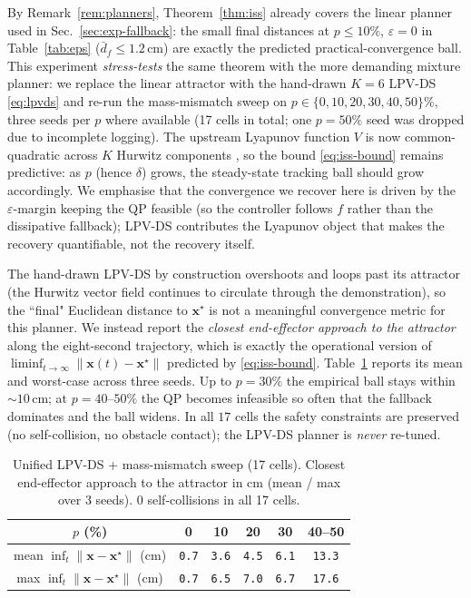 \documentclass[10pt,conference]{IEEEtran}
\newcommand{\bx}{\bm{x}}
\theoremstyle{remark}
\theoremstyle{plain}
\begin{document}
By Remark~\ref{rem:planners}, Theorem~\ref{thm:iss} already
covers the linear planner used in
Sec.~\ref{sec:exp-fallback}: the small final distances at
$p\!\le\!10\%$, $\varepsilon\!=\!0$ in Table~\ref{tab:eps}
($\bar d_f\!\le\!1.2$\,cm) are exactly the predicted
practical-convergence ball. This experiment \emph{stress-tests}
the same theorem with the more demanding mixture planner: we
replace the linear attractor with the hand-drawn $K{=}6$ LPV-DS
\eqref{eq:lpvds} and re-run the mass-mismatch sweep on
$p\in\{0,10,20,30,40,50\}\%$, three seeds per $p$ where available
(17 cells in total; one $p{=}50\%$ seed was dropped due to
incomplete logging). The
upstream Lyapunov function $V$ is now common-quadratic across
$K$ Hurwitz components \cite{figueroa2018lpvds}, so the bound
\eqref{eq:iss-bound} remains predictive: as $p$ (hence $\delta$)
grows, the steady-state tracking ball should grow accordingly.
We emphasise that the convergence we recover here is driven by
the $\varepsilon$-margin keeping the QP feasible (so the
controller follows $f$ rather than the dissipative fallback);
LPV-DS contributes the Lyapunov object that makes the recovery
quantifiable, not the recovery itself.

The hand-drawn LPV-DS by construction overshoots and loops past
its attractor (the Hurwitz vector field continues to circulate
through the demonstration), so the ``final" Euclidean distance
to $\bx^\star$ is not a meaningful convergence metric for this
planner. We instead report the \emph{closest end-effector
approach to the attractor} along the eight-second trajectory,
which is exactly the operational version of
$\liminf_{t\to\infty}\|\bx(t){-}\bx^\star\|$ predicted by
\eqref{eq:iss-bound}. Table~\ref{tab:unified} reports its mean
and worst-case across three seeds. Up to $p{=}30\%$ the
empirical ball stays within $\sim 10$\,cm; at $p{=}40$--$50\%$
the QP becomes infeasible so often that the fallback dominates
and the ball widens. In all $17$ cells the safety constraints
are preserved (no self-collision, no obstacle contact); the
LPV-DS planner is \emph{never} re-tuned.

\begin{table}[t]
\centering
\caption{Unified LPV-DS + mass-mismatch sweep (17 cells).
Closest end-effector approach to the attractor in cm
(mean / max over 3 seeds). 0 self-collisions in all 17 cells.}
\label{tab:unified}
\small
\begin{tabular}{@{}cccccc@{}}
\toprule
$p$ (\%) & 0 & 10 & 20 & 30 & 40--50 \\
\midrule
mean $\inf_t \|\bx{-}\bx^\star\|$ (cm)
                & \texttt{0.7} & \texttt{3.6}
                & \texttt{4.5} & \texttt{6.1}
                & \texttt{13.3} \\
max\phantom{n} $\inf_t \|\bx{-}\bx^\star\|$ (cm)
                & \texttt{0.7} & \texttt{6.5}
                & \texttt{7.0} & \texttt{6.7}
                & \texttt{17.6} \\
\bottomrule
\end{tabular}
\end{table}
\end{document}
